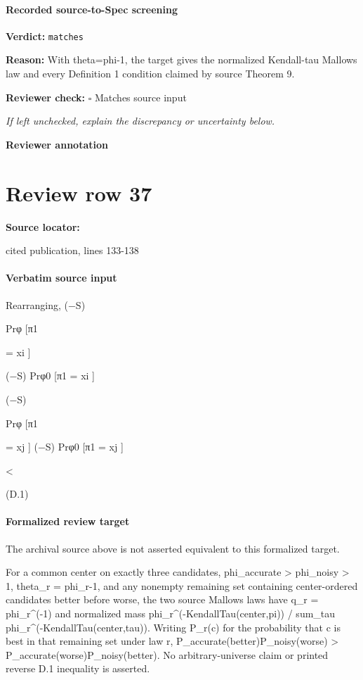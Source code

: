 \documentclass[10pt]{article}
\newcommand{\reviewerbox}{%
  \par\noindent\fbox{\parbox{0.96\linewidth}{\rule{0pt}{0.38in}}}\par
}
\newcommand{\reviewmatch}[1]{%
  \par\noindent\textbf{Reviewer check:} $\square$\; #1\par
  \noindent\emph{If left unchecked, explain the discrepancy or uncertainty below.}\par
}
\begin{document}
\paragraph{Recorded source-to-Spec screening}
\textbf{Verdict:} \texttt{matches}
\\
{\raggedright
\textbf{Reason:} With theta=phi-\allowbreak{}1, the target gives the normalized Kendall-\allowbreak{}tau Mallows law and every Definition 1 condition claimed by source Theorem 9.\allowbreak{}
\par}
\reviewmatch{Matches source input}
\noindent\textbf{Reviewer annotation}\par
\reviewerbox
\clearpage
\hypertarget{source-claim-7751231944a77b74}{}
\section*{Review row 37}
\textbf{Source locator:} {\footnotesize\raggedright cited publication, lines 133-\allowbreak{}138\par}
\paragraph{Verbatim source input}
\begin{ReviewVerbatim}
Rearranging,
(−S)

Prφ [π1

= xi ]

(−S)
Prφ0 [π1
= xi ]

(−S)

Prφ [π1

= xj ]
(−S)
Prφ0 [π1
= xj ]

<

(D.1)
\end{ReviewVerbatim}


\paragraph{Formalized review target}
The archival source above is not asserted equivalent to this formalized target.
\begin{ReviewVerbatim}
For a common center on exactly three candidates, phi_accurate > phi_noisy > 1, theta_r = phi_r-1, and any nonempty remaining set containing center-ordered candidates better before worse, the two source Mallows laws have q_r = phi_r^(-1) and normalized mass phi_r^(-KendallTau(center,pi)) / sum_tau phi_r^(-KendallTau(center,tau)). Writing P_r(c) for the probability that c is best in that remaining set under law r, P_accurate(better)P_noisy(worse) > P_accurate(worse)P_noisy(better). No arbitrary-universe claim or printed reverse D.1 inequality is asserted.
\end{ReviewVerbatim}
\end{document}

